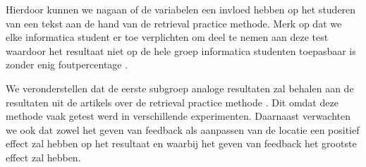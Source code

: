 \documentclass{hogent-article}
\begin{document}
    Hierdoor kunnen we nagaan of de variabelen een invloed hebben op het studeren van een tekst aan de hand van de retrieval practice methode. Merk op dat we elke informatica student er toe verplichten om deel te nemen aan deze test waardoor het resultaat niet op de hele groep informatica studenten toepasbaar is zonder enig foutpercentage \autocite{karpicke2009metacognitive}.
    
    We veronderstellen dat de eerste subgroep analoge resultaten zal behalen aan de resultaten uit de artikels over de retrieval practice methode \autocite{butler2010repeated, pyc2012test, karpicke2007repeated, karpicke2008critical}. Dit omdat deze methode vaak getest werd in verschillende experimenten.
    Daarnaast verwachten we ook dat zowel het geven van feedback als aanpassen van de locatie een positief effect zal hebben op het resultaat en waarbij het geven van feedback het grootste effect zal hebben.
    
	
	\printbibliography[heading=bibintoc]
	
\end{document}
